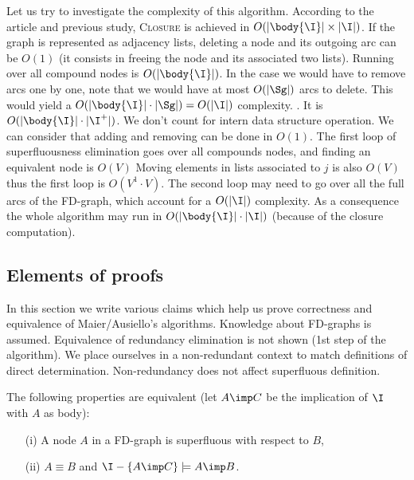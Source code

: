 Let us try to investigate the complexity of this algorithm. According to the 
article and previous study, \textsc{Closure} is achieved in $O(|\body{\I}| 
\times |\I|)$. If the graph is
represented as adjacency lists, deleting a node and its outgoing arc can be
$O(1)$ (it consists in freeing the node and its associated two lists). Running 
over all compound nodes is $O(|\body{\I}|)$. In the case we would have to 
remove arcs one by one, note that we would have at most $O(|\Sg|)$ arcs to 
delete. This would yield a $O(|\body{\I}| \cdot |\Sg|) = O(|\I|)$
complexity. . It is $O(|\body{\I}| \cdot 
|\I^{+}|)$. We don't count for intern data structure operation. We can consider
that adding and removing can be done in $O(1)$. The first loop of 
superfluousness elimination goes over all compounds nodes, and finding an 
equivalent node is $O(V)$ Moving elements in lists associated to $j$ is also
$O(V)$ thus the first loop is $O(V^1 \cdot V)$. The second loop may need to 
go over all the full arcs of the FD-graph, which account for a $O(|\I|)$ 
complexity. As a consequence the whole algorithm may run in $O(|\body{\I}| 
\cdot |\I|)$ (because of the closure computation).



\subsection{Elements of proofs}

In this section we write various claims which help us prove correctness and 
equivalence of Maier/Ausiello's algorithms. Knowledge about FD-graphs is 
assumed. Equivalence of redundancy elimination is not shown (1st step of 
the algorithm). We place ourselves in a non-redundant context to match
definitions of direct determination. Non-redundancy does not affect superfluous
definition.

\begin{proposition} \label{prop:maier.equiv_sup_sub} The following properties
are equivalent (let $A \imp C$ be the implication of $\I$ with $A$ as
body):
\begin{itemize}
	\item[(i)] A node $A$ in a FD-graph is superfluous with respect to $B$,
	\item[(ii)] $A \equiv B$ and $\I - \{A \imp C \} \models A \imp B$.
\end{itemize}
\end{proposition}

